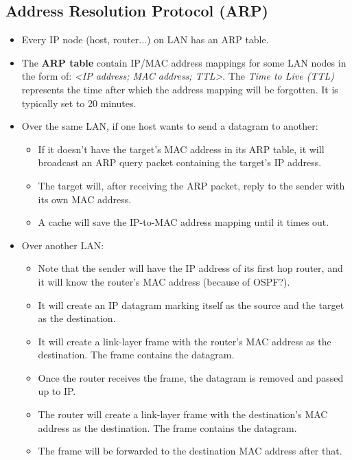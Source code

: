 \documentclass{article}
\begin{document}
\subsection{Address Resolution Protocol (ARP)}

\begin{itemize}
\item Every IP node (host, router...) on LAN has an ARP table.
\item The {\bf ARP table} contain IP/MAC address mappings for some LAN nodes in the form of: \emph{<IP address; MAC address; TTL>}. The \emph{Time to Live (TTL)} represents the time after which the address mapping will be forgotten. It is typically set to 20 minutes.
\item Over the same LAN, if one host wants to send a datagram to another:
\begin{itemize}
\item If it doesn't have the target's MAC address in its ARP table, it will broadcast an ARP query packet containing the target's IP address.
\item The target will, after receiving the ARP packet, reply to the sender with its own MAC address.
\item A cache will save the IP-to-MAC address mapping until it times out.
\end{itemize}
\item Over another LAN:
\begin{itemize}
\item Note that the sender will have the IP address of its first hop router, and it will know the router's MAC address (because of OSPF?).
\item It will create an IP datagram marking itself as the source and the target as the destination.
\item It will create a link-layer frame with the router's MAC address as the destination. The frame contains the datagram.
\item Once the router receives the frame, the datagram is removed and passed up to IP.
\item The router will create a link-layer frame with the destination's MAC address as the destination. The frame contains the datagram.
\item The frame will be forwarded to the destination MAC address after that.
\end{itemize}
\end{itemize}

\end{document}
